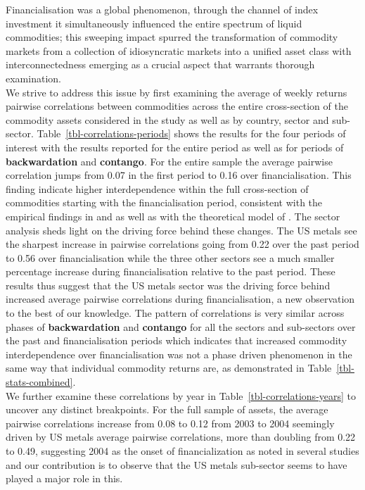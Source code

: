 \documentclass[
  authoryear,
  preprint,
  3p]{elsarticle}
\begin{document}
Financialisation was a global phenomenon, through the channel of index
investment it simultaneously influenced the entire spectrum of liquid
commodities; this sweeping impact spurred the transformation of
commodity markets from a collection of idiosyncratic markets into a
unified asset class with interconnectedness emerging as a crucial aspect
that warrants thorough examination.\\
We strive to address this issue by first examining the average of weekly
returns pairwise correlations between commodities across the entire
cross-section of the commodity assets considered in the study as well as
by country, sector and sub-sector. Table~\ref{tbl-correlations-periods}
shows the results for the four periods of interest with the results
reported for the entire period as well as for periods of
\textbf{backwardation} and \textbf{contango}. For the entire sample the
average pairwise correlation jumps from 0.07 in the first period to 0.16
over financialisation. This finding indicate higher interdependence
within the full cross-section of commodities starting with the
financialisation period, consistent with the empirical findings in
\citet{fryMcKibbin_evolution_2023} and
\citet{mayer_financialization_2017} as well as with the theoretical
model of \citet{basak_model_2016}. The sector analysis sheds light on
the driving force behind these changes. The US metals see the sharpest
increase in pairwise correlations going from 0.22 over the past period
to 0.56 over financialisation while the three other sectors see a much
smaller percentage increase during financialisation relative to the past
period. These results thus suggest that the US metals sector was the
driving force behind increased average pairwise correlations during
financialisation, a new observation to the best of our knowledge. The
pattern of correlations is very similar across phases of
\textbf{backwardation} and \textbf{contango} for all the sectors and
sub-sectors over the past and financialisation periods which indicates
that increased commodity interdependence over financialisation was not a
phase driven phenomenon in the same way that individual commodity
returns are, as demonstrated in Table~\ref{tbl-stats-combined}.\\
We further examine these correlations by year in
Table~\ref{tbl-correlations-years} to uncover any distinct breakpoints.
For the full sample of assets, the average pairwise correlations
increase from 0.08 to 0.12 from 2003 to 2004 seemingly driven by US
metals average pairwise correlations, more than doubling from 0.22 to
0.49, suggesting 2004 as the onset of financialization as noted in
several studies \citep{baker_financialization_2021, tang_index_2012} and
our contribution is to observe that the US metals sub-sector seems to
have played a major role in this.
\end{document}
